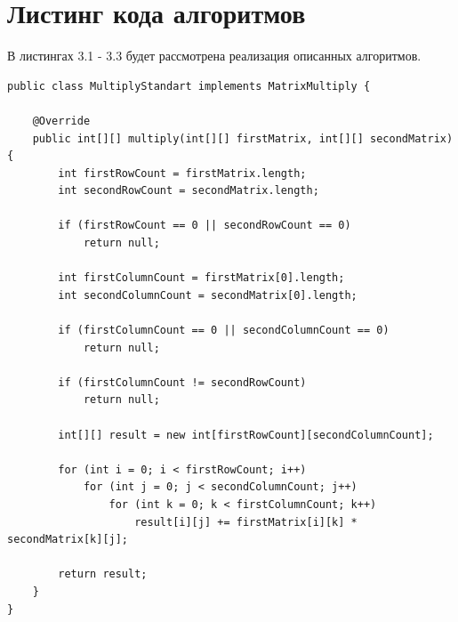 \documentclass[12pt]{report}
\begin{document}
\section{Листинг кода алгоритмов}
В листингах 3.1 - 3.3 будет рассмотрена реализация описанных алгоритмов.

\begin{lstlisting}[label=CodeStand,caption= Стандартный алгоритм умножения матриц]
public class MultiplyStandart implements MatrixMultiply {

    @Override
    public int[][] multiply(int[][] firstMatrix, int[][] secondMatrix) {
        int firstRowCount = firstMatrix.length;
        int secondRowCount = secondMatrix.length;

        if (firstRowCount == 0 || secondRowCount == 0)
            return null;

        int firstColumnCount = firstMatrix[0].length;
        int secondColumnCount = secondMatrix[0].length;

        if (firstColumnCount == 0 || secondColumnCount == 0)
            return null;

        if (firstColumnCount != secondRowCount)
            return null;

        int[][] result = new int[firstRowCount][secondColumnCount];

        for (int i = 0; i < firstRowCount; i++)
            for (int j = 0; j < secondColumnCount; j++)
                for (int k = 0; k < firstColumnCount; k++)
                    result[i][j] += firstMatrix[i][k] * secondMatrix[k][j];

        return result;
    }
}
\end{lstlisting}
\end{document}
